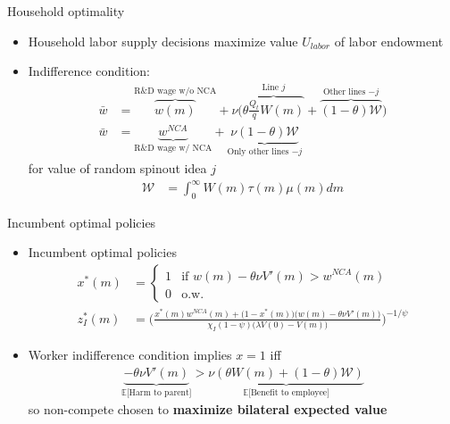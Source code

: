 \documentclass[english,usenames,dvipsnames]{beamer}
\begin{document}
\begin{frame}{Household optimality}
\begin{itemize}
	\item Household labor supply decisions maximize value $U_{labor}$ of labor endowment
	\item Indifference condition: 
	\begin{align*}
	\bar{w} &= \overbrace{w(m)}^{\textrm{R\&D wage w/o NCA}} + \nu \Big(\overbrace{\theta \frac{Q_t}{q} W(m)}^{\textrm{Line $j$}} + \overbrace{(1-\theta) \mathcal{W}}^{\textrm{Other lines $-j$}} \Big) \\
	\bar{w} &= \underbrace{w^{NCA}}_{\textrm{R\&D wage w/ NCA}} + \underbrace{\nu (1-\theta) \mathcal{W}}_{\textrm{Only other lines $-j$}}
	\end{align*}
	for value of random spinout idea $j$
	\begin{align*}
	\mathcal{W} &= \int_0^{\infty} W(m) \tau(m) \mu(m) dm
	\end{align*}
\end{itemize}
\end{frame}

\begin{frame}{Incumbent optimal policies}
\begin{itemize}
	\item Incumbent optimal policies
	\small
	\begin{align*}
	x^*(m) &= 
	\begin{cases}
	1 & \textrm{if } w(m) - \theta \nu V'(m) > w^{NCA}(m) \\
	0 & \textrm{o.w.}
	\end{cases}\\ 
	z_I^*(m) &= \Bigg( \frac{x^*(m) w^{NCA}(m) + \Big(1-x^*(m)\Big) \Big(w(m) - \theta \nu V'(m)\Big)}{\chi_I (1-\psi) \Big(\lambda V(0) - V(m) \Big)} \Bigg)^{-1/\psi} 
	\end{align*}
	\normalsize
	\item Worker indifference condition implies $x = 1$ iff
	\begin{align*}
		\underbrace{- \theta \nu V'(m)}_{\textrm{$\mathbb{E}$[Harm to parent]}} > \underbrace{\nu (\theta W(m) + (1-\theta) \mathcal{W})}_{\textrm{$\mathbb{E}$[Benefit to employee]}}  
	\end{align*}
	so non-compete chosen to \textbf{\alert{maximize bilateral expected value}}
\end{itemize}
\end{frame}
\end{document}
